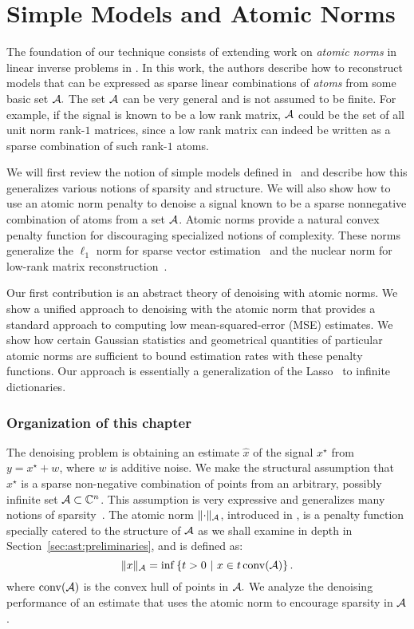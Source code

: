\chapter{Simple Models and Atomic Norms}
\label{chap:ast}

The foundation of our technique consists of extending work on \emph{atomic
norms} in linear inverse problems in \cite{crpw}. In this work, the authors
describe how to reconstruct models that can be expressed as sparse linear
combinations of \emph{atoms} from some basic set $\mathcal{A}.$ The set $\mathcal{A}$ can be very
general and is not assumed to be finite. For example, if the signal is known to
be a low rank matrix, $\mathcal{A}$ could be the set of all unit norm rank-$1$ matrices,
since a low rank matrix can indeed be written as a sparse combination of such
rank-$1$ atoms.

We will first review the notion of simple models defined in~\cite{crpw} and
describe how this generalizes various notions of sparsity and structure. We will
also show how to use an atomic norm penalty to denoise a signal known to be a
sparse nonnegative combination of atoms from a set $\mathcal{A}$. Atomic norms provide a
natural convex penalty function for discouraging specialized notions of
complexity. These norms generalize the $\ell_1$ norm for sparse vector
estimation~\cite{candes06} and the nuclear norm for low-rank matrix
reconstruction~\cite{Recht10,CandesRecht09}.

Our first contribution is an abstract theory of denoising with atomic norms. We
show a unified approach to denoising with the atomic norm that provides a
standard approach to computing low mean-squared-error (MSE) estimates. We show
how certain Gaussian statistics and geometrical quantities of particular atomic
norms are sufficient to bound estimation rates with these penalty functions. Our
approach is essentially a generalization of the Lasso~\cite{tibshirani96,chen98}
to infinite dictionaries.

\subsection*{Organization of this chapter}

The denoising problem is obtaining an estimate $\hat{x}$ of the signal $x^\star$
from $y = x^\star + w$, where $w$ is additive noise. We make the structural
assumption that $x^\star$ is a sparse non-negative combination of points from an
arbitrary, possibly infinite set $\mathcal{A} \subset \mathbb{C}^n$. This assumption is very
expressive and generalizes many notions of sparsity~\cite{crpw}. The atomic norm
$\lVert\cdot\rVert_{\mathcal{A}}$, introduced in \cite{crpw}, is a penalty function specially
catered to the structure of $\mathcal{A}$ as we shall examine in depth in
Section~\ref{sec:ast:preliminaries}, and is defined as:
\begin{equation}
\label{def-atnorm}
\lVert x\rVert_{\mathcal{A}} = \inf\left\{t > 0 ~\middle|~x \in t \operatorname{conv}(\mathcal{A}) \right\}.
\end{equation}
 where $\operatorname{conv}(\mathcal{A})$ is the convex hull
of points in $\mathcal{A}.$ We analyze the denoising performance of an estimate that uses
the atomic norm to encourage sparsity in $\mathcal{A}$.

